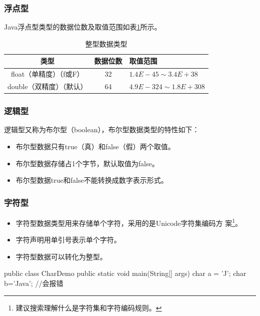 \subsubsection{浮点型}

Java浮点型类型的数据位数及取值范围如表\ref{tab:float-type}所示。

\begin{table}[!htbp]
  \centering
  \caption{整型数据类型}
  \label{tab:float-type}
  \begin{tabular}{|c|c|l|}
    \hline
    {\bf 类型} & {\bf 数据位数} & {\bf 取值范围}   \\
    \hline
    float（单精度）（f或F） & 32 & $1.4E-45 \sim 3.4E+38$\\
    \hline
      double（双精度）（默认） & 64 & $4.9E-324 \sim 1.8E+308$\\
    \hline
  \end{tabular}
\end{table}

\subsubsection{逻辑型}

逻辑型又称为布尔型（boolean），布尔型数据类型的特性如下：

\begin{itemize}
\item 布尔型数据只有true（真）和false（假）两个取值。
\item 布尔型数据存储占1个字节，默认取值为false。
\item 布尔型数据true和false不能转换成数字表示形式。
\end{itemize}

\subsubsection{字符型}

\begin{itemize}
\item 字符型数据类型用来存储单个字符，采用的是Unicode字符集编码方
  案\footnote{建议搜索理解什么是字符集和字符编码规则。}。
\item 字符声明用单引号表示单个字符。
\item 字符型数据可以转化为整型。
\end{itemize}

  
\begin{javaCode}
  public class CharDemo {
    public static void main(String[] args) {
      char a = 'J';
      char b='Java';  //会报错
    }
  }
\end{javaCode}
 
